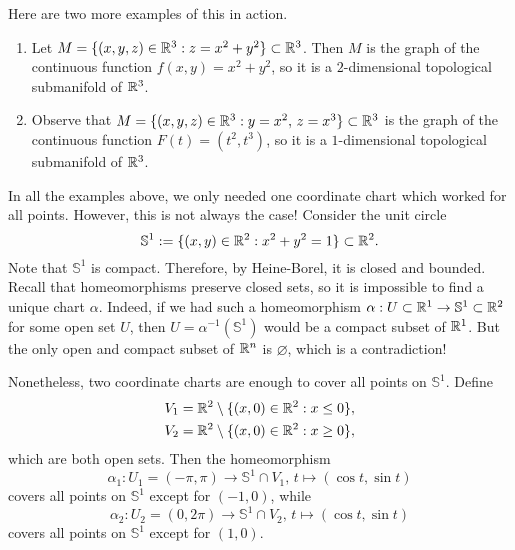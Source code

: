 Here are two more examples of this in action. 
\begin{enumerate}[(1)]
    \item Let $M = \{(x, y, z) \in \mathbb{R}^3 : z = x^2 + y^2\} \subset \mathbb{R}^3$. 
    Then $M$ is the graph of the continuous function $f(x, y) = x^2 + y^2$, 
    so it is a $2$-dimensional topological submanifold of $\mathbb{R}^3$. 
    \item Observe that $M = \{(x, y, z) \in \mathbb{R}^3 : y = x^2,\, z = x^3\} 
    \subset \mathbb{R}^3$ is the graph of the continuous function $F(t) = (t^2, t^3)$, 
    so it is a $1$-dimensional topological submanifold of $\mathbb{R}^3$.
\end{enumerate}
In all the examples above, we only needed one coordinate chart which 
worked for all points. However, this is not always the case! Consider 
the unit circle 
\[ \mathbb{S}^1 := \{(x, y) \in \mathbb{R}^2 : x^2 + y^2 = 1 \} \subset \mathbb{R}^2. \] 
Note that $\mathbb{S}^1$ is compact. Therefore, by Heine-Borel, 
it is closed and bounded. Recall that homeomorphisms preserve closed sets, 
so it is impossible to find a unique chart $\alpha$. Indeed, if we had 
such a homeomorphism $\alpha : U \subset \mathbb{R}^1 \to \mathbb{S}^1 \subset \mathbb{R}^2$ 
for some open set $U$, then $U = \alpha^{-1}(\mathbb{S}^1)$ would be 
a compact subset of $\mathbb{R}^1$. But the only open and compact subset of 
$\mathbb{R}^n$ is $\varnothing$, which is a contradiction! 

Nonetheless, two coordinate charts are enough to cover all points on 
$\mathbb{S}^1$. Define 
\begin{align*}
    V_1 = \mathbb{R}^2 \setminus \{(x, 0) \in \mathbb{R}^2 : x \leq 0\}, \\ 
    V_2 = \mathbb{R}^2 \setminus \{(x, 0) \in \mathbb{R}^2 : x \geq 0\},
\end{align*}
which are both open sets. Then the homeomorphism 
\[ \alpha_1 : U_1 = (-\pi, \pi) \to \mathbb{S}^1 \cap V_1,\,
 t \mapsto (\cos t, \sin t) \]
covers all points on $\mathbb{S}^1$ except for $(-1, 0)$, while 
\[ \alpha_2 : U_2 = (0, 2\pi) \to \mathbb{S}^1 \cap V_2,\,
 t \mapsto (\cos t, \sin t) \]
covers all points on $\mathbb{S}^1$ except for $(1, 0)$. 